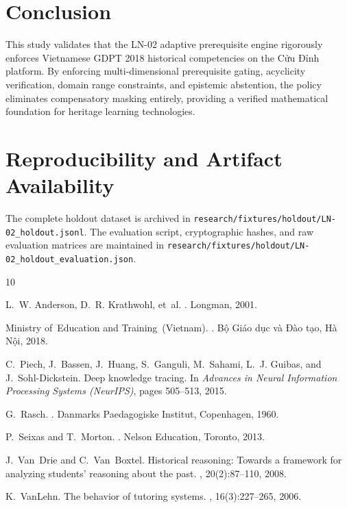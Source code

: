 \documentclass[11pt,a4paper]{article}
\begin{document}
\section{Conclusion}
This study validates that the LN-02 adaptive prerequisite engine rigorously enforces Vietnamese GDPT 2018 historical competencies on the Cửu Đỉnh platform. By enforcing multi-dimensional prerequisite gating, acyclicity verification, domain range constraints, and epistemic abstention, the policy eliminates compensatory masking entirely, providing a verified mathematical foundation for heritage learning technologies.

\section*{Reproducibility and Artifact Availability}
The complete holdout dataset is archived in \texttt{research/fixtures/holdout/LN-02\_holdout.jsonl}. The evaluation script, cryptographic hashes, and raw evaluation matrices are maintained in \texttt{research/fixtures/holdout/LN-02\_holdout\_evaluation.json}.


\begin{thebibliography}{10}

L.~W. Anderson, D.~R. Krathwohl, et~al.
.
\newblock Longman, 2001.

Ministry of~Education and Training~(Vietnam).
.
\newblock Bộ Giáo dục và Đào tạo, Hà Nội, 2018.

C.~Piech, J.~Bassen, J.~Huang, S.~Ganguli, M.~Sahami, L.~J. Guibas, and J.~Sohl-Dickstein.
\newblock Deep knowledge tracing.
\newblock In {\em Advances in Neural Information Processing Systems (NeurIPS)}, pages 505--513, 2015.

G.~Rasch.
.
\newblock Danmarks Paedagogiske Institut, Copenhagen, 1960.

P.~Seixas and T.~Morton.
.
\newblock Nelson Education, Toronto, 2013.

J.~Van~Drie and C.~Van~Boxtel.
\newblock Historical reasoning: Towards a framework for analyzing students' reasoning about the past.
, 20(2):87--110, 2008.

K.~VanLehn.
\newblock The behavior of tutoring systems.
, 16(3):227--265, 2006.

\end{thebibliography}
\end{document}
